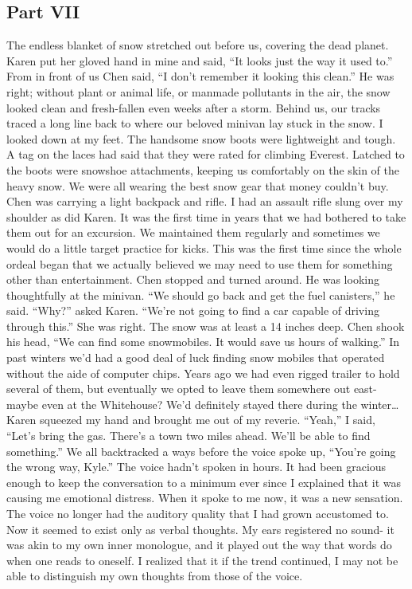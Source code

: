 \documentclass[a4paper]{article}
\begin{document}
\subsection{Part VII}
The endless blanket of snow stretched out before us, covering the dead planet. Karen put her gloved hand in mine and said, “It looks just the way it used to.”
From in front of us Chen said, “I don’t remember it looking this clean.”
He was right; without plant or animal life, or manmade pollutants in the air, the snow looked clean and fresh-fallen even weeks after a storm.
Behind us, our tracks traced a long line back to where our beloved minivan lay stuck in the snow. I looked down at my feet. The handsome snow boots were lightweight and tough. A tag on the laces had said that they were rated for climbing Everest. Latched to the boots were snowshoe attachments, keeping us comfortably on the skin of the heavy snow. We were all wearing the best snow gear that money couldn’t buy.
Chen was carrying a light backpack and rifle. I had an assault rifle slung over my shoulder as did Karen. It was the first time in years that we had bothered to take them out for an excursion. We maintained them regularly and sometimes we would do a little target practice for kicks. This was the first time since the whole ordeal began that we actually believed we may need to use them for something other than entertainment.
Chen stopped and turned around. He was looking thoughtfully at the minivan. “We should go back and get the fuel canisters,” he said.
“Why?” asked Karen. “We’re not going to find a car capable of driving through this.”
She was right. The snow was at least a 14 inches deep. Chen shook his head, “We can find some snowmobiles. It would save us hours of walking.”
In past winters we’d had a good deal of luck finding snow mobiles that operated without the aide of computer chips. Years ago we had even rigged trailer to hold several of them, but eventually we opted to leave them somewhere out east- maybe even at the Whitehouse? We’d definitely stayed there during the winter…
Karen squeezed my hand and brought me out of my reverie. “Yeah,” I said, “Let’s bring the gas. There’s a town two miles ahead. We’ll be able to find something.”
We all backtracked a ways before the voice spoke up, “You’re going the wrong way, Kyle.”
The voice hadn’t spoken in hours. It had been gracious enough to keep the conversation to a minimum ever since I explained that it was causing me emotional distress. When it spoke to me now, it was a new sensation.
The voice no longer had the auditory quality that I had grown accustomed to. Now it seemed to exist only as verbal thoughts. My ears registered no sound- it was akin to my own inner monologue, and it played out the way that words do when one reads to oneself. I realized that it if the trend continued, I may not be able to distinguish my own thoughts from those of the voice.
\end{document}
